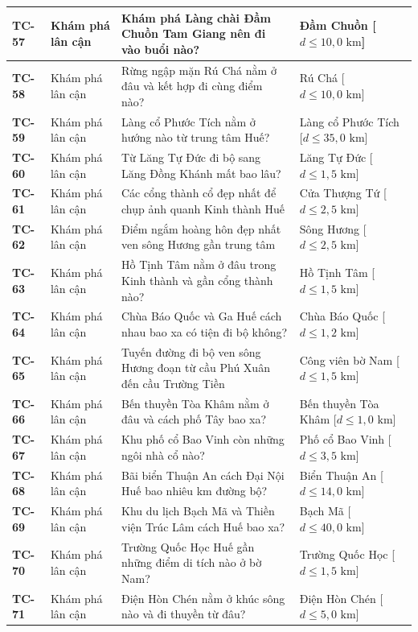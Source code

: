 \begin{longtable}{|>{\centering\arraybackslash\bfseries}p{1.35cm}|>{\raggedright\arraybackslash}p{2.6cm}|>{\raggedright\arraybackslash}p{6.35cm}|>{\raggedright\arraybackslash}p{4.3cm}|}
TC-57 & Khám phá lân cận & Khám phá Làng chài Đầm Chuồn Tam Giang nên đi vào buổi nào? & Đầm Chuồn [$d \le 10{,}0\text{ km}$] \\ \hline
TC-58 & Khám phá lân cận & Rừng ngập mặn Rú Chá nằm ở đâu và kết hợp đi cùng điểm nào? & Rú Chá [$d \le 10{,}0\text{ km}$] \\ \hline
TC-59 & Khám phá lân cận & Làng cổ Phước Tích nằm ở hướng nào từ trung tâm Huế? & Làng cổ Phước Tích [$d \le 35{,}0\text{ km}$] \\ \hline
TC-60 & Khám phá lân cận & Từ Lăng Tự Đức đi bộ sang Lăng Đồng Khánh mất bao lâu? & Lăng Tự Đức [$d \le 1{,}5\text{ km}$] \\ \hline
TC-61 & Khám phá lân cận & Các cổng thành cổ đẹp nhất để chụp ảnh quanh Kinh thành Huế & Cửa Thượng Tứ [$d \le 2{,}5\text{ km}$] \\ \hline
TC-62 & Khám phá lân cận & Điểm ngắm hoàng hôn đẹp nhất ven sông Hương gần trung tâm & Sông Hương [$d \le 2{,}5\text{ km}$] \\ \hline
TC-63 & Khám phá lân cận & Hồ Tịnh Tâm nằm ở đâu trong Kinh thành và gần cổng thành nào? & Hồ Tịnh Tâm [$d \le 1{,}5\text{ km}$] \\ \hline
TC-64 & Khám phá lân cận & Chùa Báo Quốc và Ga Huế cách nhau bao xa có tiện đi bộ không? & Chùa Báo Quốc [$d \le 1{,}2\text{ km}$] \\ \hline
TC-65 & Khám phá lân cận & Tuyến đường đi bộ ven sông Hương đoạn từ cầu Phú Xuân đến cầu Trường Tiền & Công viên bờ Nam [$d \le 1{,}5\text{ km}$] \\ \hline
TC-66 & Khám phá lân cận & Bến thuyền Tòa Khâm nằm ở đâu và cách phố Tây bao xa? & Bến thuyền Tòa Khâm [$d \le 1{,}0\text{ km}$] \\ \hline
TC-67 & Khám phá lân cận & Khu phố cổ Bao Vinh còn những ngôi nhà cổ nào? & Phố cổ Bao Vinh [$d \le 3{,}5\text{ km}$] \\ \hline
TC-68 & Khám phá lân cận & Bãi biển Thuận An cách Đại Nội Huế bao nhiêu km đường bộ? & Biển Thuận An [$d \le 14{,}0\text{ km}$] \\ \hline
TC-69 & Khám phá lân cận & Khu du lịch Bạch Mã và Thiền viện Trúc Lâm cách Huế bao xa? & Bạch Mã [$d \le 40{,}0\text{ km}$] \\ \hline
TC-70 & Khám phá lân cận & Trường Quốc Học Huế gần những điểm di tích nào ở bờ Nam? & Trường Quốc Học [$d \le 1{,}5\text{ km}$] \\ \hline
TC-71 & Khám phá lân cận & Điện Hòn Chén nằm ở khúc sông nào và đi thuyền từ đâu? & Điện Hòn Chén [$d \le 5{,}0\text{ km}$] \\ \hline

\end{longtable}
